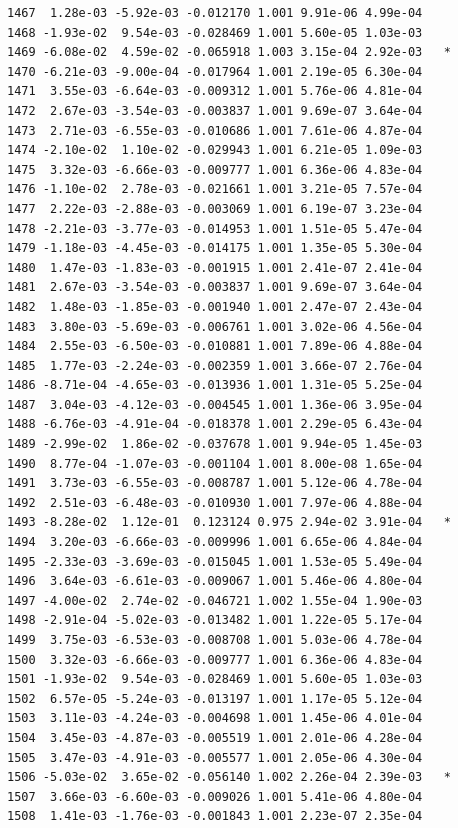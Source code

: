 \documentclass[
  letterpaper,
  DIV=11,
  numbers=noendperiod]{scrartcl}
\begin{document}
\begin{verbatim}
1467  1.28e-03 -5.92e-03 -0.012170 1.001 9.91e-06 4.99e-04    
1468 -1.93e-02  9.54e-03 -0.028469 1.001 5.60e-05 1.03e-03    
1469 -6.08e-02  4.59e-02 -0.065918 1.003 3.15e-04 2.92e-03   *
1470 -6.21e-03 -9.00e-04 -0.017964 1.001 2.19e-05 6.30e-04    
1471  3.55e-03 -6.64e-03 -0.009312 1.001 5.76e-06 4.81e-04    
1472  2.67e-03 -3.54e-03 -0.003837 1.001 9.69e-07 3.64e-04    
1473  2.71e-03 -6.55e-03 -0.010686 1.001 7.61e-06 4.87e-04    
1474 -2.10e-02  1.10e-02 -0.029943 1.001 6.21e-05 1.09e-03    
1475  3.32e-03 -6.66e-03 -0.009777 1.001 6.36e-06 4.83e-04    
1476 -1.10e-02  2.78e-03 -0.021661 1.001 3.21e-05 7.57e-04    
1477  2.22e-03 -2.88e-03 -0.003069 1.001 6.19e-07 3.23e-04    
1478 -2.21e-03 -3.77e-03 -0.014953 1.001 1.51e-05 5.47e-04    
1479 -1.18e-03 -4.45e-03 -0.014175 1.001 1.35e-05 5.30e-04    
1480  1.47e-03 -1.83e-03 -0.001915 1.001 2.41e-07 2.41e-04    
1481  2.67e-03 -3.54e-03 -0.003837 1.001 9.69e-07 3.64e-04    
1482  1.48e-03 -1.85e-03 -0.001940 1.001 2.47e-07 2.43e-04    
1483  3.80e-03 -5.69e-03 -0.006761 1.001 3.02e-06 4.56e-04    
1484  2.55e-03 -6.50e-03 -0.010881 1.001 7.89e-06 4.88e-04    
1485  1.77e-03 -2.24e-03 -0.002359 1.001 3.66e-07 2.76e-04    
1486 -8.71e-04 -4.65e-03 -0.013936 1.001 1.31e-05 5.25e-04    
1487  3.04e-03 -4.12e-03 -0.004545 1.001 1.36e-06 3.95e-04    
1488 -6.76e-03 -4.91e-04 -0.018378 1.001 2.29e-05 6.43e-04    
1489 -2.99e-02  1.86e-02 -0.037678 1.001 9.94e-05 1.45e-03    
1490  8.77e-04 -1.07e-03 -0.001104 1.001 8.00e-08 1.65e-04    
1491  3.73e-03 -6.55e-03 -0.008787 1.001 5.12e-06 4.78e-04    
1492  2.51e-03 -6.48e-03 -0.010930 1.001 7.97e-06 4.88e-04    
1493 -8.28e-02  1.12e-01  0.123124 0.975 2.94e-02 3.91e-04   *
1494  3.20e-03 -6.66e-03 -0.009996 1.001 6.65e-06 4.84e-04    
1495 -2.33e-03 -3.69e-03 -0.015045 1.001 1.53e-05 5.49e-04    
1496  3.64e-03 -6.61e-03 -0.009067 1.001 5.46e-06 4.80e-04    
1497 -4.00e-02  2.74e-02 -0.046721 1.002 1.55e-04 1.90e-03    
1498 -2.91e-04 -5.02e-03 -0.013482 1.001 1.22e-05 5.17e-04    
1499  3.75e-03 -6.53e-03 -0.008708 1.001 5.03e-06 4.78e-04    
1500  3.32e-03 -6.66e-03 -0.009777 1.001 6.36e-06 4.83e-04    
1501 -1.93e-02  9.54e-03 -0.028469 1.001 5.60e-05 1.03e-03    
1502  6.57e-05 -5.24e-03 -0.013197 1.001 1.17e-05 5.12e-04    
1503  3.11e-03 -4.24e-03 -0.004698 1.001 1.45e-06 4.01e-04    
1504  3.45e-03 -4.87e-03 -0.005519 1.001 2.01e-06 4.28e-04    
1505  3.47e-03 -4.91e-03 -0.005577 1.001 2.05e-06 4.30e-04    
1506 -5.03e-02  3.65e-02 -0.056140 1.002 2.26e-04 2.39e-03   *
1507  3.66e-03 -6.60e-03 -0.009026 1.001 5.41e-06 4.80e-04    
1508  1.41e-03 -1.76e-03 -0.001843 1.001 2.23e-07 2.35e-04    

\end{verbatim}
\end{document}
